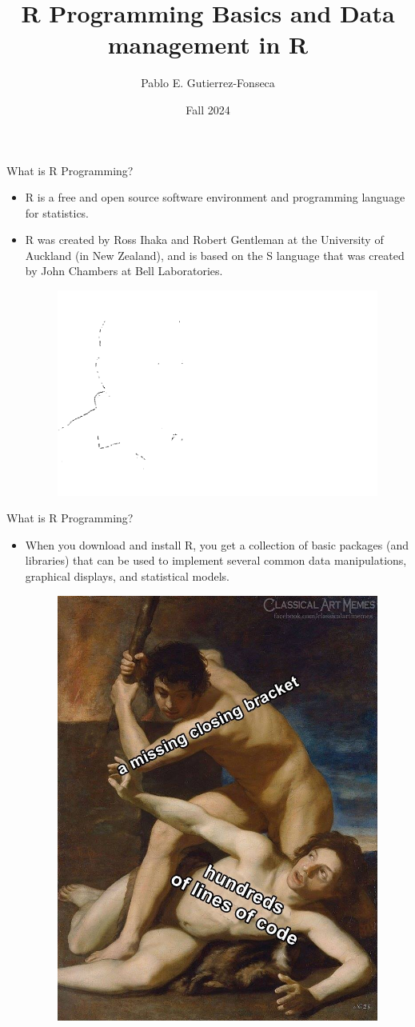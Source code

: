 \documentclass[
  ignorenonframetext,
]{beamer}
\title{R Programming Basics and Data management in R}
\author{Pablo E. Gutierrez-Fonseca}
\date{Fall 2024}
\providecommand{\tightlist}{%
  \setlength{\itemsep}{0pt}\setlength{\parskip}{0pt}}
\begin{document}
\frame{\titlepage}

\begin{frame}{What is R Programming?}
\label{what-is-r-programming}
\begin{itemize}
\tightlist
\item
  R is a free and open source software environment and programming
  language for statistics.
\end{itemize}

\begin{itemize}
\tightlist
\item
  R was created by Ross Ihaka and Robert Gentleman at the University of
  Auckland (in New Zealand), and is based on the S language that was
  created by John Chambers at Bell Laboratories.

  \begin{figure}
  \includegraphics[width=0.5\linewidth]{fig/criadores_r} \end{figure}
\end{itemize}
\end{frame}

\begin{frame}{What is R Programming?}
\label{what-is-r-programming-1}
\begin{itemize}
\tightlist
\item
  When you download and install R, you get a collection of basic
  packages (and libraries) that can be used to implement several common
  data manipulations, graphical displays, and statistical models.

  \begin{figure}
  \includegraphics[width=0.3\linewidth]{fig/meme} \end{figure}
\end{itemize}
\end{frame}
\end{document}
